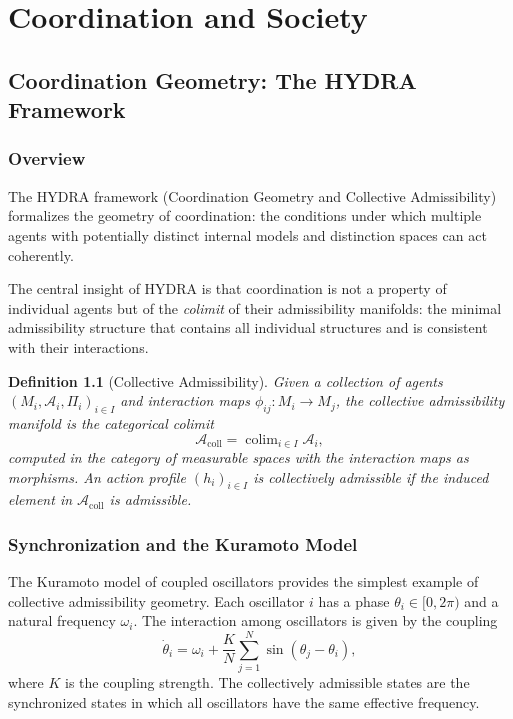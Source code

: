 \documentclass[12pt,a4paper]{book}
\newtheorem{definition}[theorem]{Definition}
\theoremstyle{remark}
\theoremstyle{definition}
\begin{document}
\part{Coordination and Society}

\chapter{Coordination Geometry: The HYDRA Framework}

\section{Overview}

The HYDRA framework (Coordination Geometry and Collective Admissibility)
formalizes the geometry of coordination: the conditions under which
multiple agents with potentially distinct internal models and distinction
spaces can act coherently.

The central insight of HYDRA is that coordination is not a property of
individual agents but of the \emph{colimit} of their admissibility
manifolds: the minimal admissibility structure that contains all
individual structures and is consistent with their interactions.

\begin{definition}[Collective Admissibility]
Given a collection of agents $(M_i, \mathcal{A}_i, \Pi_i)_{i \in I}$
and interaction maps $\phi_{ij} : M_i \to M_j$, the \emph{collective
admissibility manifold} is the categorical colimit
\begin{equation}
  \mathcal{A}_{\mathrm{coll}}
  = \operatorname{colim}_{i \in I} \mathcal{A}_i,
\end{equation}
computed in the category of measurable spaces with the interaction maps
as morphisms. An action profile $(h_i)_{i \in I}$ is \emph{collectively
admissible} if the induced element in $\mathcal{A}_{\mathrm{coll}}$ is
admissible.
\end{definition}

\section{Synchronization and the Kuramoto Model}

The Kuramoto model of coupled oscillators provides the simplest example
of collective admissibility geometry. Each oscillator $i$ has a phase
$\theta_i \in [0, 2\pi)$ and a natural frequency $\omega_i$. The
interaction among oscillators is given by the coupling
\begin{equation}
  \dot\theta_i = \omega_i + \frac{K}{N}\sum_{j=1}^N \sin(\theta_j - \theta_i),
\end{equation}
where $K$ is the coupling strength. The collectively admissible states
are the synchronized states in which all oscillators have the same
effective frequency.
\end{document}
